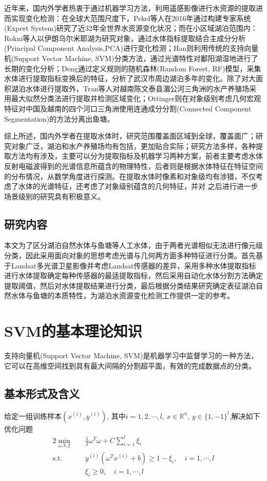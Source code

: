 \documentclass[supercite]{upcthesis}
\begin{document}
近年来，国内外学者热衷于通过机器学习方法，利用遥感影像进行水资源的提取进而实现变化检测：在全球大范围尺度下，Pekel等人在2016年通过构建专家系统(Expert System)研究了近32年全世界水资源变化状况\cite{Pekel2016High}；而在小区域湖泊范围内：Rokni等人以伊朗乌尔米耶湖为研究对象，通过水体指标提取结合主成分分析(Principal Component Analysis,PCA)进行变化检测\cite{Rokni2014Water}；Han则利用传统的支持向量机(Support Vector Machine, SVM)分类方法，通过光谱特性对鄱阳湖湿地进行了长期的变化分析\cite{Han2015Four}；Deng通过定义规则的随机森林(Random Forest, RF)模型，采集水体进行提取指标变换后的特征，分析了武汉市周边湖泊多年的变化\cite{Deng2017Spatio}。除了对大面积湖泊水体进行提取外，Tran等人对越南陈文泰县湄公河三角洲的水产养殖场采用最大似然分类法进行提取并检测区域变化\cite{Tran2015Dynamics}；Ottinger则在对象级别考虑几何宏观特征对中国及越南的四个河口三角洲使用连通成分分割(Connected Component Segmentation)的方法分离出鱼塘\cite{Ottinger2017}。

综上所述，国内外学者在提取水体时，研究范围覆盖面区域到全球，覆盖面广；研究对象广泛，湖泊和水产养殖场均有包括，更加贴合实际；研究方法多样，各种提取方法均有涉及，主要可以分为提取指标及机器学习两种方案，前者主要考虑水体反射电磁波得到的光谱信息所蕴含的物理特性，后者则是根据水体特征在特征空间的分布情况，从数学角度进行探测。在提取水体时像素和对象级均有涉猎，不仅考虑了水体的光谱特征，还考虑了对象级别蕴含的几何特征，并对
之后进行进一步场景级别的研究具有积极意义。
\subsection{研究内容}
本文为了区分湖泊自然水体与鱼塘等人工水体，由于两者光谱相似无法进行像元级分类，因此采用面向对象的思想考虑光谱与几何两方面多种特征进行分类。首先基于Landsat多光谱卫星影像并考虑Landsat传感器的差异，采用多种水体提取指标进行水体提取确定每种传感器的最适提取指标，然后采用自动化水体分割方法确定提取阈值，然后对水体提取结果进行分类，最后根据分类结果研究确定表征湖泊自然水体与鱼塘的本质特性，为湖泊水资源变化检测工作提供一定的参考。
\section{SVM的基本理论知识}
支持向量机(Support Vector Machine, SVM)是机器学习中监督学习的一种方法，它可以在高维空间找到具有最大间隔的分割超平面，有效的完成数据点的分类。
\subsection{基本形式及含义}
给定一组训练样本$(x^{(i)},y^{(i)})$, 其中$i=1,2,\cdots,l$, $x\in\mathbb{R}^{n}$, $y\in\{1,-1\}^l$,解决如下优化问题
\begin{alignat}{2}
\min\limits_{\omega,b,\xi}\quad & \frac{1}{2}\omega^T\omega+C\sum_{i=1}^{l}\xi_i\\
\text{s.t.}\quad & y^{(i)}(\omega^Tx^{(i)}+b) \geq 1-\xi_i,\quad i=1,\cdots,l\nonumber\\
& \xi_i \geq 0,\quad i=1,\cdots,l\nonumber
\end{alignat}
\end{document}
